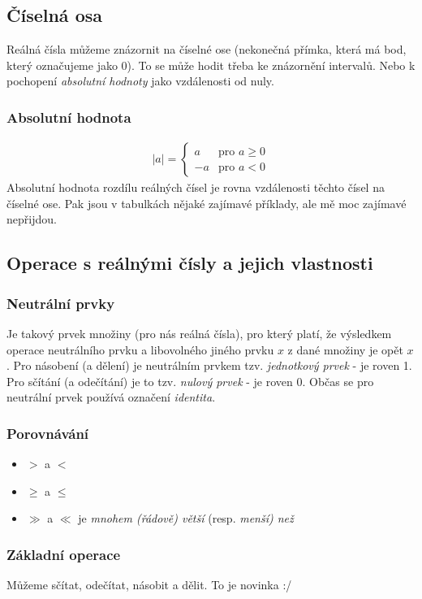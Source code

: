 \documentclass[12pt]{article}
\providecommand{\abs}[1]{\lvert#1\rvert}
\begin{document}
\subsection{Číselná osa}
Reálná čísla můžeme znázornit na číselné ose (nekonečná přímka, která má bod, který označujeme jako 0). To se může hodit třeba ke znázornění intervalů. Nebo k pochopení \emph{absolutní hodnoty} jako vzdálenosti od nuly.
\subsubsection{Absolutní hodnota}
\begin{align}
 \abs{a} = \left\{\begin{array}{lr}
       a & \text{pro } a \geq 0\\
       -a  & \text{pro } a < 0
        \end{array} \right.
\end{align}
Absolutní hodnota rozdílu reálných čísel je rovna vzdálenosti těchto čísel na číselné ose. Pak jsou v tabulkách nějaké zajímavé příklady, ale mě moc zajímavé nepřijdou.
\subsection{Operace s reálnými čísly a jejich vlastnosti}
\subsubsection{Neutrální prvky}
Je takový prvek množiny (pro nás reálná čísla), pro který platí, že výsledkem operace neutrálního prvku a libovolného jiného prvku $x$ z dané množiny je opět $x$. Pro násobení (a dělení) je neutrálním prvkem tzv. \emph{jednotkový prvek} - je roven 1. Pro sčítání (a odečítání) je to tzv. \emph{nulový prvek} -  je roven 0. Občas se pro neutrální prvek používá označení \emph{identita}.
\subsubsection{Porovnávání}
\begin{itemize}
\item $>$ a $<$
\item $\geq$ a $\leq$
\item $\gg$ a $\ll$ je \emph{mnohem (řádově) větší} (resp. \emph{menší) než}
\end{itemize}
\subsubsection{Základní operace}
Můžeme sčítat, odečítat, násobit a dělit. To je novinka :/
\end{document}
